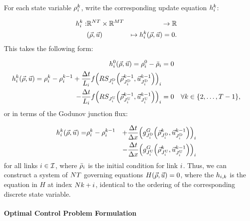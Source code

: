 For each state variable $\rho_{i}^{k}$, write the corresponding
update equation $h_{i}^{k}$:

\begin{eqnarray*}
	\syseq_{\link}^{\tind}: & \mathbb{R}^{\nlinks\ntime}\times\mathbb{R}^{\ncontrols\ntime} & \rightarrow\mathbb{R}\\
	& \left(\state,\control\right) & \mapsto\syseq_{\link}^{\tind}\left(\state,\control\right)=0.
\end{eqnarray*}
This takes the following form:

\begin{eqnarray}
	h_{\link}^{0}\left(\state,\control\right)=\discrete{\link}0-\initdiscrete_{\link} & =0\label{eq:init-ge}\\
	\syseq_{\link}^{\tind}\left(\state,\control\right)=\discrete{\link}{\tind}-\discrete{\link}{\tind-1}+\frac{\Delta t}{L_{\link}}f\left(\RS_{\jdown{\link}}\left(\juncstate{\jdown{\link}}{\tind-1},\junccon{\jdown{\link}}{\tind-1}\right)\right)_{\link}\nonumber \\
	-\frac{\Delta t}{L_{\link}}f\left(\RS_{\jup{\link}}\left(\juncstate{\jup{\link}}{\tind-1},\junccon{\jup{\link}}{\tind-1}\right)\right)_{\link} & =0 & \forall k\in\intrange 2{\ntime-1},\label{eq:main-ge}
\end{eqnarray}
or in terms of the Godunov junction flux:

\begin{eqnarray}
	\syseq_{\link}^{\tind}\left(\state,\control\right)= & \discrete{\link}{\tind}-\discrete{\link}{\tind-1} & +\dfrac{\Delta t}{\Delta x}\left(\god_{\jdown{\link}}\left(\juncstate{\jdown{\link}}{\tind},\junccon{\jdown{\link}}{\tind-1}\right)\right)_{\link}\nonumber \\
	&  & -\dfrac{\Delta t}{\Delta x}\left(\god_{\jup{\link}}\left(\juncstate{\jup{\link}}{\tind},\junccon{\jup{\link}}{\tind-1}\right)\right)_{\link}\label{eq:syseq-god}
\end{eqnarray}
for all links $i\in\mathcal{I}$, where $\bar{\rho}_{i}$ is
the initial condition for link $i$. Thus, we can construct a
system of $N T$ governing equations $H\left(\state,\control\right)=0$,
where the $h_{i,k}$ is the equation in $H$ at index $N k+i$,
identical to the ordering of the corresponding discrete state variable.

\paragraph{Optimal Control Problem Formulation\label{par:Optimization-Problem}}


